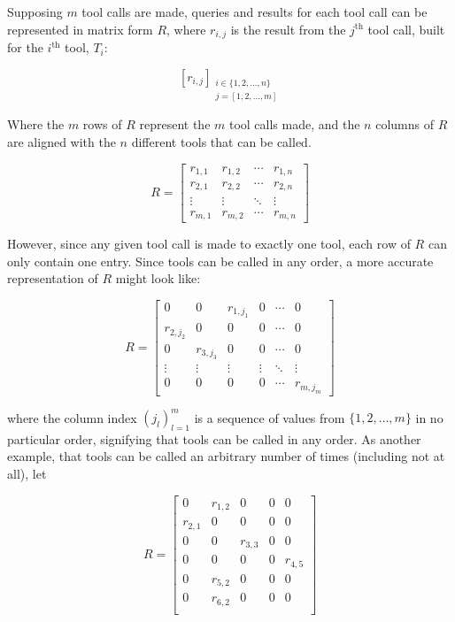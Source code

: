 \documentclass{article}
\begin{document}
Supposing $m$ tool calls are made, queries and results for each tool call can be represented in matrix form $R$, where $r_{i,j}$ is the result from the $j^\text{th}$ tool call, built for the $i^\text{th}$ tool, $T_i$:

\[
[ r_{i,j} ]_{\substack{
i \in \{ 1, 2, \dots, n \} \\
j = [ 1, 2, \dots, m ]
}}
\]

Where the $m$ rows of $R$ represent the $m$ tool calls made, and the $n$ columns of $R$ are aligned with the $n$ different tools that can be called.

\[
R =
\begin{bmatrix}
r_{1,1} & r_{1,2} & \cdots & r_{1,n} \\
r_{2,1} & r_{2,2} & \cdots & r_{2,n} \\
\vdots & \vdots & \ddots & \vdots \\
r_{m,1} & r_{m,2} & \cdots & r_{m,n}
\end{bmatrix}
\]

However, since any given tool call is made to exactly one tool, each row of $R$ can only contain one entry. Since tools can be called in any order, a more accurate representation of $R$ might look like:

\[
R =
\begin{bmatrix}
0 & 0 & r_{1,j_1} & 0 & \cdots & 0 \\
r_{2,j_2} & 0 & 0 & 0 & \cdots & 0 \\
0 & r_{3,j_3} & 0 & 0 & \cdots & 0 \\
\vdots & \vdots & \vdots & \vdots & \ddots & \vdots \\
0 & 0 & 0 & 0 & \cdots & r_{m,j_m}
\end{bmatrix}
\]

where the column index $(j_l)_{l=1}^m$ is a sequence of values from $\{1, 2, \dots, m\}$ in no particular order, signifying that tools can be called in any order. As another example, that tools can be called an arbitrary number of times (including not at all), let

\[
R =
\begin{bmatrix}
0 & r_{1,2} & 0 & 0 & 0 \\
r_{2,1} & 0 & 0 & 0 & 0 \\
0 & 0 & r_{3,3} & 0 & 0 \\
0 & 0 & 0 & 0 & r_{4,5} \\
0 & r_{5,2} & 0 & 0 & 0 \\
0 & r_{6,2} & 0 & 0 & 0 \\
\end{bmatrix}
\]
\end{document}
